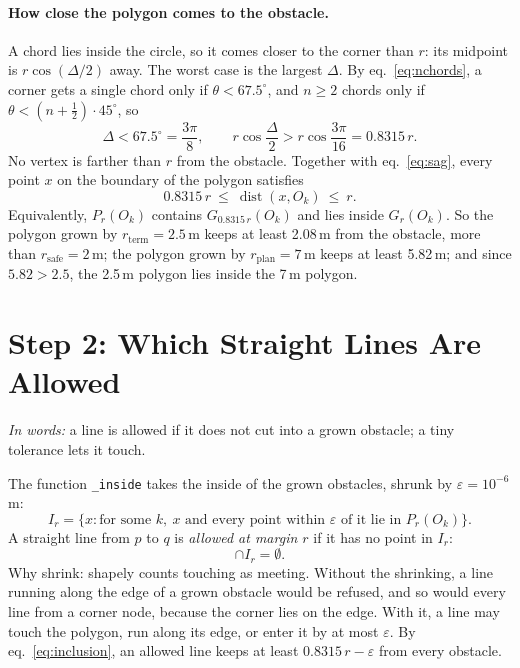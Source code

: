 \documentclass[10pt]{article}
\newcommand{\code}[1]{\texttt{#1}}
\newcommand{\rplan}{r_{\mathrm{plan}}}
\newcommand{\rsafe}{r_{\mathrm{safe}}}
\newcommand{\rterm}{r_{\mathrm{term}}}
\begin{document}
\paragraph{How close the polygon comes to the obstacle.} A chord lies inside the circle, so it comes closer to the
corner than $r$: its midpoint is $r\cos(\Delta/2)$ away. The worst case is the largest $\Delta$. By
eq.~\eqref{eq:nchords}, a corner gets a single chord only if $\theta < 67.5^\circ$, and $n \ge 2$ chords only if
$\theta < (n + \frac{1}{2}) \cdot 45^\circ$, so
\begin{equation}
  \Delta < 67.5^\circ = \frac{3\pi}{8}, \qquad
  r\cos\frac{\Delta}{2} > r\cos\frac{3\pi}{16} = 0.8315\,r.
  \label{eq:sag}
\end{equation}
No vertex is farther than $r$ from the obstacle. Together with eq.~\eqref{eq:sag}, every point $x$ on the boundary of
the polygon satisfies
\begin{equation}
  \boxed{0.8315\,r \ \le\ \operatorname{dist}(x, O_k) \ \le\ r.}
  \label{eq:inclusion}
\end{equation}
Equivalently, $P_r(O_k)$ contains $G_{0.8315\,r}(O_k)$ and lies inside $G_r(O_k)$. So the polygon grown by
$\rterm = 2.5$\,m keeps at least 2.08\,m from the obstacle, more than $\rsafe = 2$\,m; the polygon grown by
$\rplan = 7$\,m keeps at least 5.82\,m; and since $5.82 > 2.5$, the 2.5\,m polygon lies inside the 7\,m polygon.

\section{Step 2: Which Straight Lines Are Allowed}

\emph{In words:} a line is allowed if it does not cut into a grown obstacle; a tiny tolerance lets it touch.

The function \code{\_inside} takes the inside of the grown obstacles, shrunk by $\varepsilon = 10^{-6}$\,m:
\begin{equation}
  I_r = \bigl\{ x : \text{for some } k,\ x \text{ and every point within } \varepsilon \text{ of it lie in } P_r(O_k) \bigr\}.
  \label{eq:inside}
\end{equation}
A straight line from $p$ to $q$ is \emph{allowed at margin $r$} if it has no point in $I_r$:
\begin{equation}
  [p, q] \cap I_r = \emptyset.
  \label{eq:clear}
\end{equation}
Why shrink: shapely counts touching as meeting. Without the shrinking, a line running along the edge of a grown obstacle
would be refused, and so would every line from a corner node, because the corner lies on the edge. With it, a line may
touch the polygon, run along its edge, or enter it by at most $\varepsilon$. By eq.~\eqref{eq:inclusion}, an allowed line
keeps at least $0.8315\,r - \varepsilon$ from every obstacle.
\end{document}
